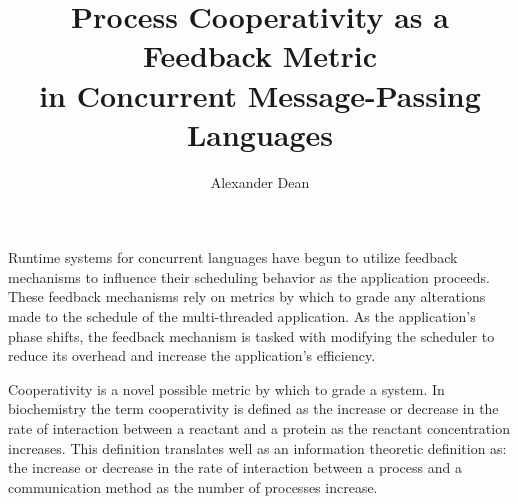 \documentclass[11pt,american]{report}
\author{Alexander Dean}    %
\title{Process Cooperativity as a Feedback Metric \\
                in Concurrent Message-Passing Languages}
\theoremstyle{definition}
\theoremstyle{remark}
\begin{document}


%
%
%
\commcertpage           %

\titlepage              %



%




%
\utabstract
{}%
\indent
Runtime systems for concurrent languages have begun to utilize feedback
mechanisms to influence their scheduling behavior as the application proceeds.
These feedback mechanisms rely on metrics by which to grade any alterations made
to the schedule of the multi-threaded application. As the application's phase
shifts, the feedback mechanism is tasked with modifying the scheduler to reduce
its overhead and increase the application's efficiency.

Cooperativity is a novel possible metric by which to grade a system. In
biochemistry the term cooperativity is defined as the increase or decrease in
the rate of interaction between a reactant and a protein as the reactant
concentration increases. This definition translates well as an information
theoretic definition as: the increase or decrease in the rate of interaction
between a process and a communication method as the number of processes
increase.
\end{document}

